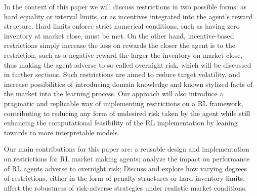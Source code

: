\documentclass{article}
\begin{document}
\begin{section}
⁤In the context of this paper we will discuss restrictions in two possible forms: as hard equality or interval limits, or as incentives integrated into the agent's reward structure. ⁤⁤Hard limits enforce strict numerical conditions, such as having zero inventory at market close, must be met. ⁤⁤On the other hand, incentive-based restrictions simply increase the loss on rewards the closer the agent is to the restriction, such as a negative reward the larger the inventory on market close, thus making the agent adverse to so called overnight risk, which will be discussed in further sections. Such restrictions are aimed to reduce target volatility, and increase possibilities of introducing domain knowledge and known stylized facts of the market into the learning process. ⁤⁤Our approach will also introduce a pragmatic and replicable way of implementing restrictions on a RL framework, contributing to reducing any form of undesired risk taken by the agent while still enhancing the computational feasibility of the RL implementation by leaning towards to more interpretable models. ⁤

Our main contributions for this paper are: a reusable design and implementation on restrictions for RL market making agents; analyze the impact on performance of RL agents adverse to overnight risk; Discuss and explore how varying degrees of restrictions, either in the form of penalty structures or hard inventory limits, affect the robustness of risk-adverse strategies under realistic market conditions.

\end{section}
\end{document}
